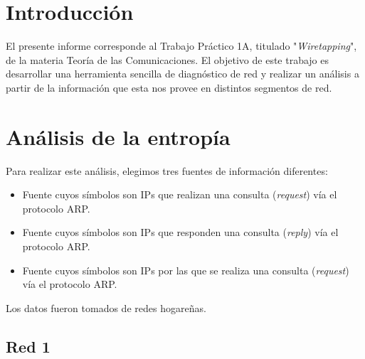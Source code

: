 \documentclass{article}
\begin{document}





\maketitle


\tableofcontents

\newpage

\section{Introducción}
El presente informe corresponde al Trabajo Práctico 1A, titulado
"\emph{Wiretapping}", de la materia Teoría de las Comunicaciones. El objetivo
de este trabajo es desarrollar una herramienta sencilla de diagnóstico de red
y realizar un análisis a partir de la información que esta nos provee en
distintos segmentos de red.

\section{Análisis de la entropía}
Para realizar este análisis, elegimos tres fuentes de información diferentes:

\begin{itemize}
    \item Fuente cuyos símbolos son IPs que realizan una consulta
        (\emph{request}) vía el protocolo ARP.
    \item Fuente cuyos símbolos son IPs que responden una consulta
        (\emph{reply}) vía el protocolo ARP.
    \item Fuente cuyos símbolos son IPs por las que se realiza una consulta
        (\emph{request}) vía el protocolo ARP.
\end{itemize}

Los datos fueron tomados de redes hogareñas.

\subsection{Red 1}
\end{document}
